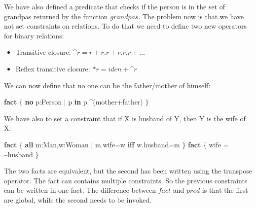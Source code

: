 \documentclass[12pt, a4paper]{report}
\newtheorem[style=M,bodystyle=\normalfont]{theorem}{Theorem}
\newtheorem[style=M,bodystyle=\normalfont]{corollary}{Corollary}
\newtheorem[style=M,bodystyle=\normalfont]{lemma}{Lemma}
\newtheorem[style=M,bodystyle=\normalfont]{definition}{Definition}
\begin{document}
    We have also defined a predicate that checks if the person is in the set of grandpas returned by the function $grandpas$. The problem now is that we have not set constraints 
    on relations. To do that we need to define two new operators for binary relations:
    \begin{itemize}
        \item Transitive closure: \textasciicircum $r=r+r.r+r.r.r+\dots$
        \item Reflex transitive closure: $*r=iden+$\textasciicircum$r$
    \end{itemize}
    We can now define that no one can be the father/mother of himself: 
    \begin{algorithmic}[H]
        \State \textbf{fact} $\{$
        \State \:\:\:\:\:\:\:\: \textbf{no} p:Person $\mid$ p \textbf{in} p.\textasciicircum(mother+father)
        \State $\}$
    \end{algorithmic} 
    We have also to set a constraint that if X is husband of Y, then Y is the wife of X:
    \begin{algorithmic}[H]
        \State \textbf{fact} $\{$
        \State \:\:\:\:\:\:\:\: \textbf{all} m:Man,w:Woman $\mid$ m.wife=w \textbf{iff} w.husband=m
        \State $\}$
        \State \textbf{fact} $\{$
        \State \:\:\:\:\:\:\:\: wife = \textasciitilde husband
        \State $\}$
    \end{algorithmic} 
    The two facts are equivalent, but the second has been written using the transpose operator. The fact can contains multiple constraints. So the previous constraints can be written 
    in one fact. The difference between $fact$ and $pred$ is that the first are global, while the second needs to be invoked.
\end{document}

